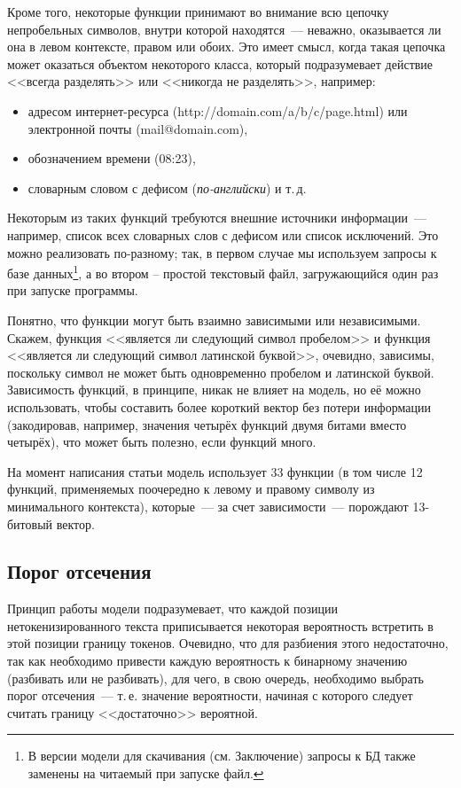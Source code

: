 \documentclass[a4paper]{article}
\begin{document}
Кроме того, некоторые функции принимают во внимание всю цепочку непробельных символов, внутри которой находятся~--- неважно, оказывается ли она в левом контексте, правом или обоих. Это имеет смысл, когда такая цепочка может оказаться объектом некоторого класса, который подразумевает действие <<всегда разделять>> или <<никогда не разделять>>, например:
\begin{itemize}
\item адресом интернет-ресурса (http://domain.com/a/b/c/page.html) или электронной почты (mail@domain.com),
\item обозначением времени (08:23),
\item словарным словом с дефисом (\textit{по-английски}) и т.\,д.
\end{itemize}

Некоторым из таких функций требуются внешние источники информации~--- например, список всех словарных слов с дефисом или список исключений. Это можно реализовать по-разному; так, в первом случае мы используем запросы к базе данных\footnote{В версии модели для скачивания (см. Заключение) запросы к БД также заменены на читаемый при запуске файл.}, а во втором – простой текстовый файл, загружающийся один раз при запуске программы.

Понятно, что функции могут быть взаимно зависимыми или независимыми. Скажем, функция <<является ли следующий символ пробелом>> и функция <<является ли следующий символ латинской буквой>>, очевидно, зависимы, поскольку символ не может быть одновременно пробелом и латинской буквой. Зависимость функций, в принципе, никак не влияет на модель, но её можно использовать, чтобы составить более короткий вектор без потери информации (закодировав, например, значения четырёх функций двумя битами вместо четырёх), что может быть полезно, если функций много.

На момент написания статьи модель использует 33 функции (в том числе 12 функций, применяемых поочередно к левому и правому символу из минимального контекста), которые~--- за счет зависимости~--- порождают 13-битовый вектор.
\subsection{Порог отсечения}
Принцип работы модели подразумевает, что каждой позиции нетокенизированного текста приписывается некоторая вероятность встретить в этой позиции границу токенов. Очевидно, что для разбиения этого недостаточно, так как необходимо привести каждую вероятность к бинарному значению (разбивать или не разбивать), для чего, в свою очередь, необходимо выбрать порог отсечения~--- т.\,е. значение вероятности, начиная с которого следует считать границу <<достаточно>> вероятной.
\end{document}
